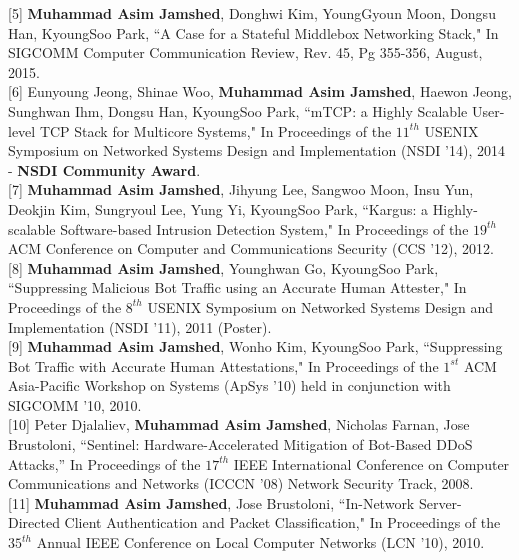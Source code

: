 \documentclass[10pt]{article}
\begin{document}
[5] {\bf Muhammad Asim Jamshed}, Donghwi Kim, YoungGyoun Moon, Dongsu Han,
KyoungSoo Park,
{ ``A Case for a Stateful Middlebox Networking Stack," }
    In SIGCOMM Computer Communication Review, Rev. 45, Pg 355-356, August, 2015.\\


[6] Eunyoung Jeong, Shinae Woo, {\bf Muhammad Asim Jamshed}, Haewon Jeong,
Sunghwan Ihm, Dongsu Han, KyoungSoo Park,
{ ``mTCP: a Highly Scalable User-level TCP Stack for Multicore Systems," }
    In Proceedings of the $11^{th}$ USENIX Symposium on Networked Systems
    Design and Implementation (NSDI '14), 2014 - {\bf NSDI Community Award}.\\

[7] {\bf Muhammad Asim Jamshed}, Jihyung Lee, Sangwoo Moon, Insu Yun,
Deokjin Kim, Sungryoul Lee, Yung Yi, KyoungSoo Park,
{ ``Kargus: a Highly-scalable Software-based Intrusion Detection System," }
    In Proceedings of the $19^{th}$ ACM Conference on Computer and
    Communications Security (CCS '12), 2012. \\

[8] {\bf Muhammad Asim Jamshed}, Younghwan Go, KyoungSoo Park,
{ ``Suppressing Malicious Bot Traffic using an Accurate Human Attester," }
     In Proceedings of the $8^{th}$ USENIX Symposium on Networked Systems
     Design and Implementation (NSDI '11), 2011 (Poster).\\
     
[9] {\bf Muhammad Asim Jamshed}, Wonho Kim, KyoungSoo Park, 
     { ``Suppressing Bot Traffic with Accurate Human Attestations," }
     In Proceedings of the $1^{st}$ ACM Asia-Pacific Workshop on Systems
     (ApSys '10) held in conjunction with SIGCOMM '10, 2010.\\

[10] Peter Djalaliev, {\bf Muhammad Asim Jamshed}, Nicholas Farnan, Jose
Brustoloni, 
	{``Sentinel: Hardware-Accelerated Mitigation of Bot-Based DDoS Attacks,''}
	In Proceedings of the $17^{th}$ IEEE International Conference on
	Computer Communications and Networks (ICCCN '08) Network Security Track, 2008. \\

[11] {\bf Muhammad Asim Jamshed}, Jose Brustoloni,
	{``In-Network Server-Directed Client Authentication and Packet Classification,"}
	In Proceedings of the $35^{th}$ Annual IEEE Conference on Local 
	Computer Networks (LCN '10), 2010.\\
\end{document}
